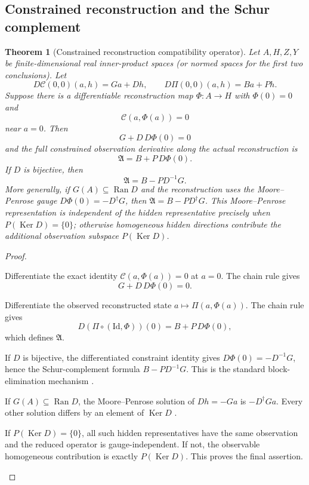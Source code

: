 \documentclass[12pt]{article}
\theoremstyle{plain}
\newtheorem{theorem}{Theorem}[section]
\theoremstyle{definition}
\theoremstyle{remark}
\newcommand{\Ran}{\operatorname{Ran}}
\newcommand{\Ker}{\operatorname{Ker}}
\newcommand{\Id}{\mathrm{Id}}
\newcommand{\Comp}{\mathfrak A}
\newcommand{\Constr}{\mathcal C}
\newcommand{\Obs}{\Pi}
\begin{document}
\subsection{Constrained reconstruction and the Schur complement}
\begin{theorem}[Constrained reconstruction compatibility operator]\label{thm:schur}
Let \(A,H,Z,Y\) be finite-dimensional real inner-product spaces (or normed spaces for the first two conclusions). Let
\[
D\Constr(0,0)(a,h)=Ga+Dh,
\qquad
D\Obs(0,0)(a,h)=Ba+Ph.
\]
Suppose there is a differentiable reconstruction map \(\Phi\colon A\to H\) with \(\Phi(0)=0\) and
\[
\Constr(a,\Phi(a))=0
\]
near \(a=0\). Then
\[
G+D\,D\Phi(0)=0
\]
and the full constrained observation derivative along the actual reconstruction is
\[
\boxed{\Comp=B+P\,D\Phi(0).}
\]
If \(D\) is bijective, then
\[
\boxed{\Comp=B-PD^{-1}G.}
\]
More generally, if \(G(A)\subseteq\Ran D\) and the reconstruction uses the Moore--Penrose gauge \(D\Phi(0)=-D^{\dagger}G\), then \(\Comp=B-PD^{\dagger}G\). This Moore--Penrose representation is independent of the hidden representative precisely when \(P(\Ker D)=\{0\}\); otherwise homogeneous hidden directions contribute the additional observation subspace \(P(\Ker D)\).
\end{theorem}

\begin{proof}
\begin{prooflines}
\item Differentiate the exact identity \(\Constr(a,\Phi(a))=0\) at \(a=0\). The chain rule gives
\[
G+D\,D\Phi(0)=0.
\]
\item Differentiate the observed reconstructed state \(a\mapsto\Obs(a,\Phi(a))\). The chain rule gives
\[
D(\Obs\circ(\Id,\Phi))(0)=B+P\,D\Phi(0),
\]
which defines \(\Comp\).
\item If \(D\) is bijective, the differentiated constraint identity gives \(D\Phi(0)=-D^{-1}G\), hence the Schur-complement formula \(B-PD^{-1}G\). This is the standard block-elimination mechanism \cite{Zhang2005}.
\item If \(G(A)\subseteq\Ran D\), the Moore--Penrose solution of \(Dh=-Ga\) is \(-D^{\dagger}Ga\). Every other solution differs by an element of \(\Ker D\) \cite{BenIsraelGreville2003}.
\item If \(P(\Ker D)=\{0\}\), all such hidden representatives have the same observation and the reduced operator is gauge-independent. If not, the observable homogeneous contribution is exactly \(P(\Ker D)\). This proves the final assertion.
\end{prooflines}
\end{proof}
\end{document}
